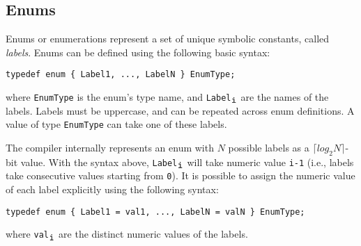 \subsection{Enums}
\label{sec:enums}

Enums or enumerations represent a set of unique symbolic constants, called \emph{labels}.
Enums can be defined using the following basic syntax:
\begin{center}
  \verb|typedef enum { Label1, ..., LabelN } EnumType;|
\end{center}
where \verb|EnumType| is the enum's type name, and \verb|Label|$_{\verb|i|}$ are the names of the labels.
Labels must be uppercase, and can be repeated across enum definitions.
A value of type \verb|EnumType| can take one of these labels.

The compiler internally represents an enum with $N$ possible labels as a $\lceil log_2N \rceil$-bit value.
With the syntax above, \verb|Label|$_{\verb|i|}$ will take numeric value \verb|i-1| (i.e., labels take consecutive values starting from \verb|0|).
It is possible to assign the numeric value of each label explicitly using the following syntax:
\begin{center}
  \verb|typedef enum { Label1 = val1, ..., LabelN = valN } EnumType;|
\end{center}
where \verb|val|$_{\verb|i|}$ are the distinct numeric values of the labels.
